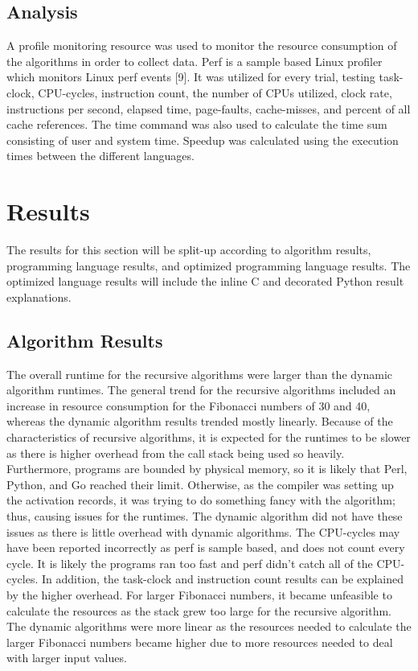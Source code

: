 \documentclass{sig-alternate}
\begin{document}
\subsection{Analysis}

A profile monitoring resource was used to monitor the resource consumption of the algorithms in order to collect data. Perf is a sample based Linux profiler which monitors Linux perf events [9]. It was utilized for every trial, testing task-clock, CPU-cycles, instruction count, the number of CPUs utilized, clock rate, instructions per second, elapsed time, page-faults, cache-misses, and percent of all cache references. The time command was also used to calculate the time sum consisting of user and system time. Speedup was calculated using the execution times between the different languages.

\section{Results}

The results for this section will be split-up according to algorithm results, programming language results, and optimized programming language results. The optimized language results will include the inline C and decorated Python result explanations.

\subsection{Algorithm Results}

The overall runtime for the recursive algorithms were larger than the dynamic algorithm runtimes. The general trend for the recursive algorithms included an increase in resource consumption for the Fibonacci numbers of 30 and 40, whereas the dynamic algorithm results trended mostly linearly. Because of the characteristics of recursive algorithms, it is expected for the runtimes to be slower as there is higher overhead from the call stack being used so heavily. Furthermore, programs are bounded by physical memory, so it is likely that Perl, Python, and Go reached their limit. Otherwise, as the compiler was setting up the activation records, it was trying to do something fancy with the algorithm; thus, causing issues for the runtimes. The dynamic algorithm did not have these issues as there is little overhead with dynamic algorithms. The CPU-cycles may have been reported incorrectly as perf is sample based, and does not count every cycle. It is likely the programs ran too fast and perf didn’t catch all of the CPU-cycles. In addition, the task-clock and instruction count results can be explained by the higher overhead. For larger Fibonacci numbers, it became unfeasible to calculate the resources as the stack grew too large for the recursive algorithm. The dynamic algorithms were more linear as the resources needed to calculate the larger Fibonacci numbers became higher due to more resources needed to deal with larger input values.
\end{document}
